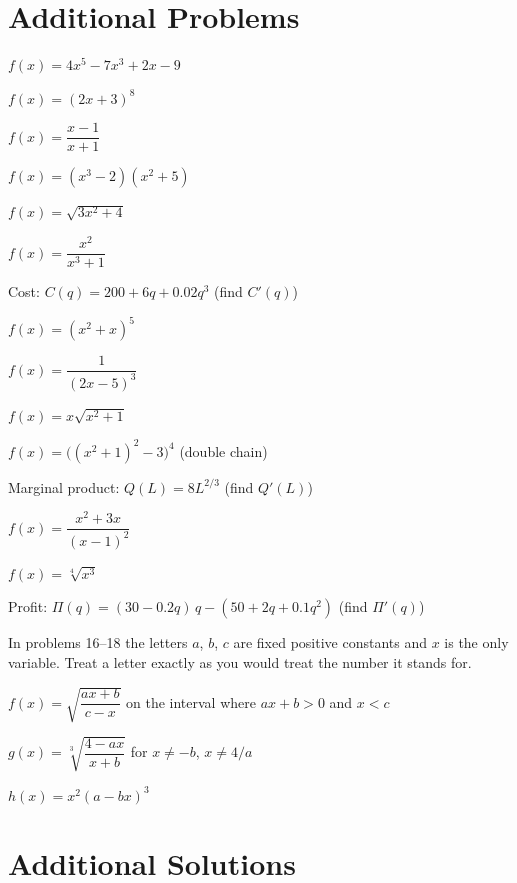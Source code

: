 \section{Additional Problems}

\begin{problems}
  \item $f(x)=4x^{5}-7x^{3}+2x-9$
  \item $f(x)=(2x+3)^{8}$
  \item $f(x)=\dfrac{x-1}{x+1}$
  \item $f(x)=(x^{3}-2)(x^{2}+5)$
  \item $f(x)=\sqrt{3x^{2}+4}$
  \item $f(x)=\dfrac{x^{2}}{x^{3}+1}$
  \item Cost: $C(q)=200+6q+0.02q^{3}$ \quad (find $C'(q)$)
  \item $f(x)=(x^{2}+x)^{5}$
  \item $f(x)=\dfrac{1}{(2x-5)^{3}}$
  \item $f(x)=x\sqrt{x^{2}+1}$
  \item $f(x)=\bigl((x^{2}+1)^{2}-3\bigr)^{4}$ \quad (double chain)
  \item Marginal product: $Q(L)=8L^{2/3}$ \quad (find $Q'(L)$)
  \item $f(x)=\dfrac{x^{2}+3x}{(x-1)^{2}}$
  \item $f(x)=\sqrt[4]{x^{3}}$
  \item Profit: $\Pi(q)=(30-0.2q)\,q-(50+2q+0.1q^{2})$ \quad (find
        $\Pi'(q)$)
\end{problems}

In problems 16--18 the letters $a$, $b$, $c$ are fixed positive constants
and $x$ is the only variable. Treat a letter exactly as you would treat the
number it stands for.

\begin{problems}[resume]
  \item $f(x)=\sqrt{\dfrac{ax+b}{c-x}}$ \quad on the interval where
        $ax+b>0$ and $x<c$
  \item $g(x)=\sqrt[3]{\dfrac{4-ax}{x+b}}$ \quad for $x\neq-b$,
        $x\neq4/a$
  \item $h(x)=x^{2}(a-bx)^{3}$
\end{problems}

\section{Additional Solutions}

